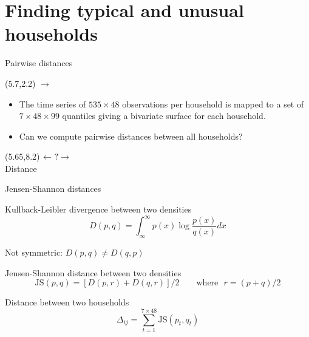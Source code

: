 \documentclass[14pt,ignorenonframetext,]{beamer}
\begin{document}
\hypertarget{finding-typical-and-unusual-households}{%
\section{Finding typical and unusual
households}\label{finding-typical-and-unusual-households}}

\begin{frame}{Pairwise distances}
\protect\hypertarget{pairwise-distances}{}

\begin{textblock}{3}(5.7,2.2)\LARGE
$\longrightarrow$
\end{textblock}
\vspace*{.9cm}\fontsize{13}{15}\sf

\begin{itemize}
\item
  The time series of \(535\times48\) observations per household is
  mapped to a set of \(7\times48\times99\) quantiles giving a bivariate
  surface for each household.
\item
  Can we compute pairwise distances between all households?
\end{itemize}

\begin{textblock}{1.48}(5.65,8.2)
$\leftarrow\hfill~?\hfill\rightarrow$\\\fontsize{11}{12}\sf
\hfill Distance \hfill
\end{textblock}

\end{frame}

\begin{frame}{Jensen-Shannon distances}
\protect\hypertarget{jensen-shannon-distances}{}

\begin{block}{Kullback-Leibler divergence between two densities}
$$D(p,q) = \int_{\infty}^\infty p(x) \log \frac{p(x)}{q(x)} dx$$
\vspace*{-0.2cm}\pause

Not symmetric: $D(p,q) \neq D(q,p)$
\end{block}
\pause

\begin{block}{Jensen-Shannon distance between two densities}
$$\text{JS}(p,q) =  [ D(p,r) +  D(q,r)] / 2\qquad\text{where~~}
r = (p+q)/2$$
\end{block}
\pause

\begin{block}{Distance between two households}
$$\Delta_{ij} = \sum_{t=1}^{7\times 48} \text{JS}(p_t,q_t)$$
\end{block}

\end{frame}
\end{document}

